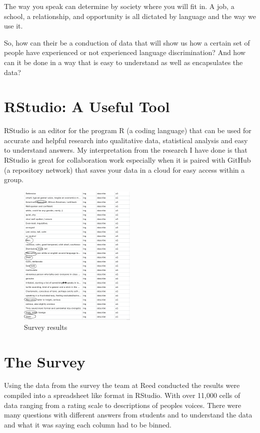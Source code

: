 \documentclass{scrartcl}
\begin{document}
The way you speak can determine by society where you will fit in. A job, a school, a relationship, and opportunity is all dictated by language and the way we use it.

So, how can their be a conduction of data that will show us how a certain set of people have experienced or not experienced language discrimination? And how can it be done in a way that is easy to understand as well as encapsulates the data? 

\section{RStudio: A Useful Tool}

RStudio is an editor for the program R (a coding language) that can be used for accurate and helpful research into qualitative data, statistical analysis and easy to understand answers. My interpretation from the research I have done is that RStudio is great for collaboration work especially when it is paired with GitHub (a repository network) that saves your data in a cloud for easy access within a group.

\begin{figure}
  \centering
  \includegraphics[width=0.5\textwidth]{projectvisual1.png}
  \caption{Survey results}
  \label{fig:survey}
\end{figure}

\section{The Survey}

Using the data from the survey the team at Reed conducted the results were compiled into a spreadsheet like format in RStudio. With over 11,000 cells of data ranging from a rating scale to descriptions of peoples voices. There were many questions with different answers from students and to understand the data and what it was saying each column had to be binned. 
\end{document}

